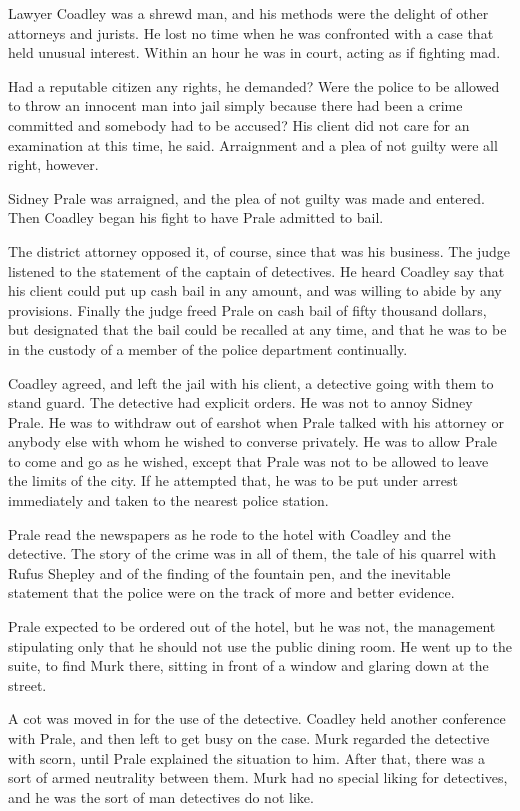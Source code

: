 \documentclass{novel}
\begin{document}
Lawyer Coadley was a shrewd man, and his methods were the delight of other attorneys and jurists. He lost no time when he was confronted with a case that held unusual interest. Within an hour he was in court, acting as if fighting mad.

Had a reputable citizen any rights, he demanded? Were the police to be allowed to throw an innocent man into jail simply because there had been a crime committed and somebody had to be accused? His client did not care for an examination at this time, he said. Arraignment and a plea of not guilty were all right, however.

Sidney Prale was arraigned, and the plea of not guilty was made and entered. Then Coadley began his fight to have Prale admitted to bail.

The district attorney opposed it, of course, since that was his business. The judge listened to the statement of the captain of detectives. He heard Coadley say that his client could put up cash bail in any amount, and was willing to abide by any provisions. Finally the judge freed Prale on cash bail of fifty thousand dollars, but designated that the bail could be recalled at any time, and that he was to be in the custody of a member of the police department continually.

Coadley agreed, and left the jail with his client, a detective going with them to stand guard. The detective had explicit orders. He was not to annoy Sidney Prale. He was to withdraw out of earshot when Prale talked with his attorney or anybody else with whom he wished to converse privately. He was to allow Prale to come and go as he wished, except that Prale was not to be allowed to leave the limits of the city. If he attempted that, he was to be put under arrest immediately and taken to the nearest police station.

Prale read the newspapers as he rode to the hotel with Coadley and the detective. The story of the crime was in all of them, the tale of his quarrel with Rufus Shepley and of the finding of the fountain pen, and the inevitable statement that the police were on the track of more and better evidence.

Prale expected to be ordered out of the hotel, but he was not, the management stipulating only that he should not use the public dining room. He went up to the suite, to find Murk there, sitting in front of a window and glaring down at the street.

A cot was moved in for the use of the detective. Coadley held another conference with Prale, and then left to get busy on the case. Murk regarded the detective with scorn, until Prale explained the situation to him. After that, there was a sort of armed neutrality between them. Murk had no special liking for detectives, and he was the sort of man detectives do not like.
\end{document}

